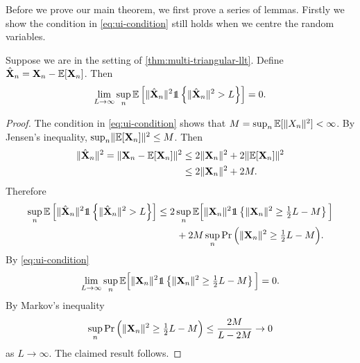 Before we prove our main theorem, we first prove a series of lemmas. Firstly we show the condition in \cref{eq:ui-condition} still holds when we centre the random variables.
\begin{lemma}
    \label{lem:ui-mean-center}
    Suppose we are in the setting of \cref{thm:multi-triangular-llt}. Define $\hat{{\mathbf X}}_n = {\mathbf X}_n - {\mathbb E}[{\mathbf X}_n]$. Then
    \begin{equation*}
        \lim_{L \to \infty} \sup_n \E \left[
            \norm{\hat{\vX}_n}^2
            \one \left\{ \norm{\hat{\vX}_n}^2 > L \right\}
        \right] = 0.
    \end{equation*}
\end{lemma}
\begin{proof}
    The condition in \cref{eq:ui-condition} shows that $M = \sup_n {\mathbb E}[\lVert X_n\rVert^2] < \infty$. By Jensen's inequality, $\sup_n \lVert{\mathbb E}[{\mathbf X}_n]\rVert^2 \leq M$. Then
    \begin{align*}
        \lVert\hat{{\mathbf X}}_n\rVert^2 = \lVert{\mathbf X}_n - {\mathbb E}[{\mathbf X}_n]\rVert^2
        &\leq 2 \lVert{\mathbf X}_n\rVert^2 + 2 \lVert{\mathbb E}[{\mathbf X}_n]\rVert^2 \\
        &\leq 2 \lVert{\mathbf X}_n\rVert^2 + 2M. \\
    \end{align*}
    Therefore
    \begin{align*}
        \sup_n \E \left[
            \norm{\hat{\vX}_n}^2
            \one \left\{ \norm{\hat{\vX}_n}^2 > L \right\}
        \right]
        &\leq 2 \sup_n \E\Big[\norm{\vX_n}^2 \one \left\{ \norm{\vX_n}^2 \geq \tfrac{1}{2} L - M\right\}\Big] \nonumber \\
        & \hspace{2em} + 2M \sup_n \Pr\Big(\norm{\vX_n}^2 \geq \tfrac{1}{2} L - M\Big).
    \end{align*}
    By \cref{eq:ui-condition}
    \begin{equation*}
        \lim_{L \to \infty} \sup_n \E\Big[
            \norm{\vX_n}^2 \one \left\{ \norm{\vX_n}^2 \geq \tfrac{1}{2} L - M\right\}
        \Big] = 0.
    \end{equation*}
    By Markov's inequality
    \begin{equation*}
        \sup_n \Pr\Big(\lVert{\mathbf X}_n\rVert^2 \geq \tfrac{1}{2} L - M\Big) \leq \frac{2M}{L - 2M} \to 0
    \end{equation*}
    as $L \to \infty$. The claimed result follows.
\end{proof}

